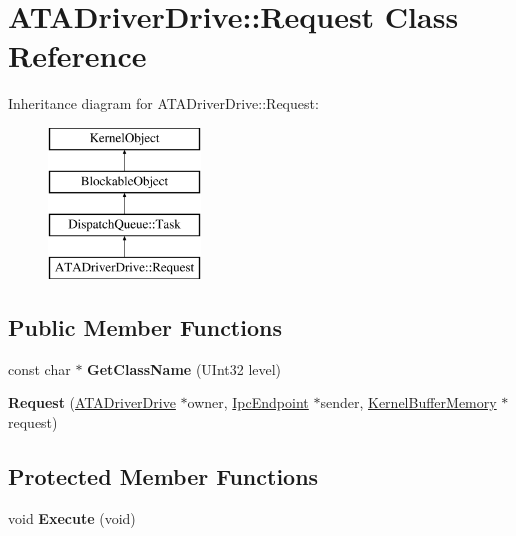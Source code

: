 \hypertarget{class_a_t_a_driver_drive_1_1_request}{}\section{A\+T\+A\+Driver\+Drive\+:\+:Request Class Reference}
\label{class_a_t_a_driver_drive_1_1_request}
Inheritance diagram for A\+T\+A\+Driver\+Drive\+:\+:Request\+:\begin{figure}[H]
\begin{center}
\leavevmode
\includegraphics[height=4.000000cm]{class_a_t_a_driver_drive_1_1_request}
\end{center}
\end{figure}
\subsection*{Public Member Functions}
\begin{DoxyCompactItemize}
\item 
\mbox{\label{class_a_t_a_driver_drive_1_1_request_ade57fc7f11f1a103cf4384a2404b7602}} 
const char $\ast$ {\bfseries Get\+Class\+Name} (U\+Int32 level)
\item 
\mbox{\label{class_a_t_a_driver_drive_1_1_request_a68da461d996261750e9c1936388ff733}} 
{\bfseries Request} (\hyperlink{class_a_t_a_driver_drive}{A\+T\+A\+Driver\+Drive} $\ast$owner, \hyperlink{class_ipc_endpoint}{Ipc\+Endpoint} $\ast$sender, \hyperlink{class_kernel_buffer_memory}{Kernel\+Buffer\+Memory} $\ast$request)
\end{DoxyCompactItemize}
\subsection*{Protected Member Functions}
\begin{DoxyCompactItemize}
\item 
\mbox{\label{class_a_t_a_driver_drive_1_1_request_a906fd326fd68e34855363e40731961ff}} 
void {\bfseries Execute} (void)
\end{DoxyCompactItemize}
